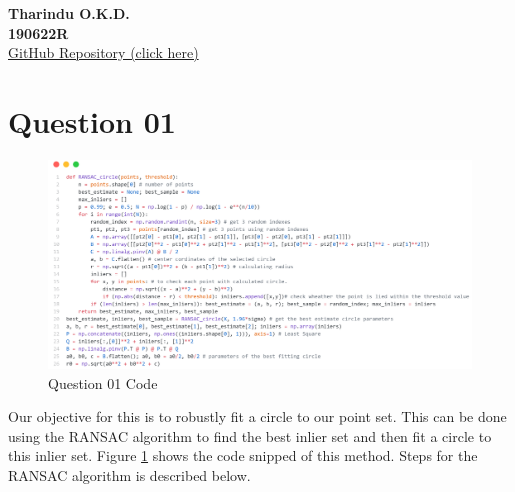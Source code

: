 \documentclass[a4paper]{article}
\author{Tharindu O.K.D.\\19062R}
\begin{document}
\begin{center}
  \textbf{Tharindu O.K.D.\\190622R}\\
  \href{https://github.com/dakshinatharindu/Image-Processing/blob/main/Assignment-02/190622R_a02.ipynb}{GitHub Repository (click here)} 
\end{center}

\section*{Question 01}
\begin{figure}[!htb]
    \centering
    \includegraphics[width=\textwidth]{images/ransac_circle.png}
    \caption{Question 01 Code}
    \label{ransac_circle}
\end{figure}
Our objective for this is to robustly fit a circle to our point set.
 This can be done using the RANSAC algorithm to find the best inlier
  set and then fit a circle to this inlier set.
   Figure \ref{ransac_circle} shows the code snipped
    of this method. Steps for the RANSAC algorithm is described below.
\end{document}
